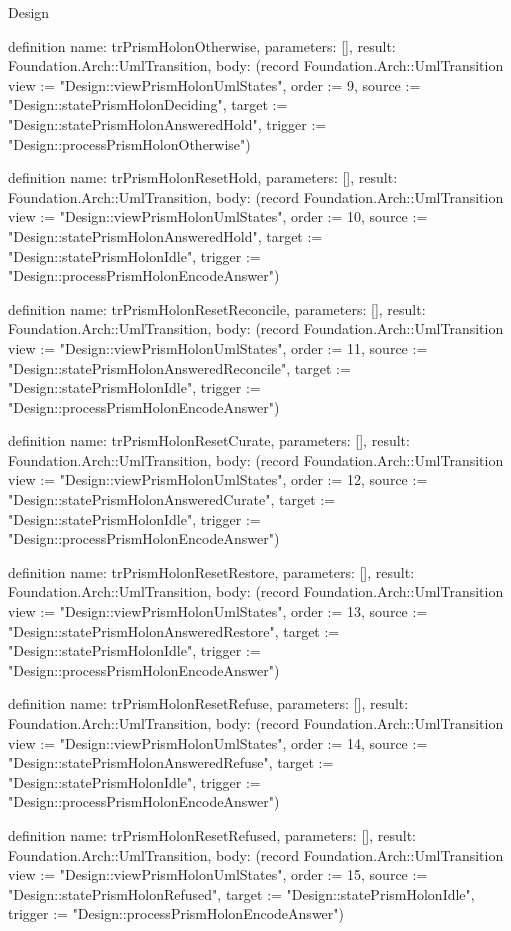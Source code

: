 \begin{lexlean}{Design}
\begin{semanticmodule}
definition{
  name: trPrismHolonOtherwise,
  parameters: [],
  result: Foundation.Arch::UmlTransition,
  body: (record Foundation.Arch::UmlTransition {view := "Design::viewPrismHolonUmlStates", order := 9, source := "Design::statePrismHolonDeciding", target := "Design::statePrismHolonAnsweredHold", trigger := "Design::processPrismHolonOtherwise"})
}

definition{
  name: trPrismHolonResetHold,
  parameters: [],
  result: Foundation.Arch::UmlTransition,
  body: (record Foundation.Arch::UmlTransition {view := "Design::viewPrismHolonUmlStates", order := 10, source := "Design::statePrismHolonAnsweredHold", target := "Design::statePrismHolonIdle", trigger := "Design::processPrismHolonEncodeAnswer"})
}

definition{
  name: trPrismHolonResetReconcile,
  parameters: [],
  result: Foundation.Arch::UmlTransition,
  body: (record Foundation.Arch::UmlTransition {view := "Design::viewPrismHolonUmlStates", order := 11, source := "Design::statePrismHolonAnsweredReconcile", target := "Design::statePrismHolonIdle", trigger := "Design::processPrismHolonEncodeAnswer"})
}

definition{
  name: trPrismHolonResetCurate,
  parameters: [],
  result: Foundation.Arch::UmlTransition,
  body: (record Foundation.Arch::UmlTransition {view := "Design::viewPrismHolonUmlStates", order := 12, source := "Design::statePrismHolonAnsweredCurate", target := "Design::statePrismHolonIdle", trigger := "Design::processPrismHolonEncodeAnswer"})
}

definition{
  name: trPrismHolonResetRestore,
  parameters: [],
  result: Foundation.Arch::UmlTransition,
  body: (record Foundation.Arch::UmlTransition {view := "Design::viewPrismHolonUmlStates", order := 13, source := "Design::statePrismHolonAnsweredRestore", target := "Design::statePrismHolonIdle", trigger := "Design::processPrismHolonEncodeAnswer"})
}

definition{
  name: trPrismHolonResetRefuse,
  parameters: [],
  result: Foundation.Arch::UmlTransition,
  body: (record Foundation.Arch::UmlTransition {view := "Design::viewPrismHolonUmlStates", order := 14, source := "Design::statePrismHolonAnsweredRefuse", target := "Design::statePrismHolonIdle", trigger := "Design::processPrismHolonEncodeAnswer"})
}

definition{
  name: trPrismHolonResetRefused,
  parameters: [],
  result: Foundation.Arch::UmlTransition,
  body: (record Foundation.Arch::UmlTransition {view := "Design::viewPrismHolonUmlStates", order := 15, source := "Design::statePrismHolonRefused", target := "Design::statePrismHolonIdle", trigger := "Design::processPrismHolonEncodeAnswer"})
}


\end{semanticmodule}
\end{lexlean}
